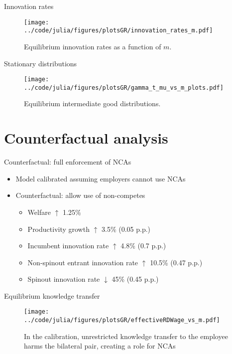 \documentclass[english,usenames,dvipsnames]{beamer}
\begin{document}
\begin{frame}{Innovation rates}
\begin{figure}
	\texttt{[image: ../code/julia/figures/plotsGR/innovation\_rates\_m.pdf]}
	\caption{Equilibrium innovation rates as a function of $m$.}
\end{figure}
\end{frame}

\begin{frame}{Stationary distributions}
\begin{figure}
	\texttt{[image: ../code/julia/figures/plotsGR/gamma\_t\_mu\_vs\_m\_plots.pdf]}
	\caption{Equilibrium intermediate good distributions.}
	\label{figure:gamma_t_mu_vs_m_plots}
\end{figure}
\end{frame}

\section{Counterfactual analysis}

\begin{frame}
\tableofcontents[currentsection]
\end{frame}

\begin{frame}{Counterfactual: full enforcement of NCAs}
\begin{itemize}
\item Model calibrated assuming employers cannot use NCAs
\item Counterfactual: allow use of non-competes
\begin{itemize}
\item Welfare $\uparrow$ 1.25\%
\item Productivity growth  $\uparrow$ 3.5\% (0.05 p.p.)
\item Incumbent innovation rate $\uparrow$ 4.8\% (0.7 p.p.)
\item Non-spinout entrant innovation rate $\uparrow$ 10.5\% (0.47 p.p.)
\item Spinout innovation rate $\downarrow$ 45\% (0.45 p.p.)
\end{itemize}
\end{itemize}
\end{frame}

\begin{frame}{Equilibrium knowledge transfer}
\begin{figure}
	\texttt{[image: ../code/julia/figures/plotsGR/effectiveRDWage\_vs\_m.pdf]}
	\caption{In the calibration, unrestricted knowledge transfer to the employee harms the bilateral pair, creating a role for NCAs}
\end{figure}
\end{frame}
\end{document}

